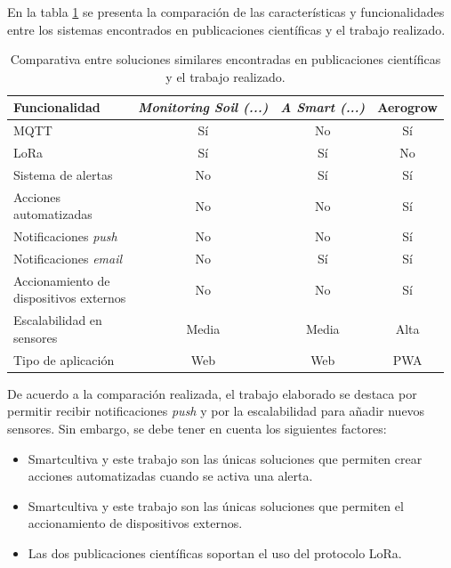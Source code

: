 En la tabla \ref{tab:comparativaTrabajoSolucionesPublicacionesCientificas} se presenta la comparación de las características y funcionalidades entre los sistemas encontrados en publicaciones científicas y el trabajo realizado.

\begin{table}[H]
	\centering
	\caption[Comparativa entre soluciones similares encontradas en publicaciones científicas y el trabajo realizado]{Comparativa entre soluciones similares encontradas en publicaciones científicas y el trabajo realizado.}
	\begin{tabular}{l c c c}    
		\toprule 
		\textbf{Funcionalidad} & \textbf{\textit{Monitoring Soil (...)}} & \textbf{\textit{A Smart (...)}}  & \textbf{Aerogrow}\\
		\midrule
		MQTT & Sí & No  & Sí\\
		LoRa & Sí & Sí  & No\\
		Sistema de alertas & No & Sí & Sí\\
		\shortstack{Acciones \\ automatizadas} & No & No & Sí\\
		Notificaciones \emph{push} & No & No & Sí\\
		Notificaciones \textit{email} & No & Sí & Sí\\
		\shortstack{Accionamiento de \\ dispositivos externos} & No & No & Sí\\
		\shortstack{Escalabilidad en \\ sensores} & Media & Media & Alta\\
		Tipo de aplicación & Web & Web & PWA\\
		\bottomrule
		\hline
	\end{tabular}
	\label{tab:comparativaTrabajoSolucionesPublicacionesCientificas}
\end{table}

De acuerdo a la comparación realizada, el trabajo elaborado se destaca por permitir recibir notificaciones \emph{push} y por la escalabilidad para añadir nuevos sensores. Sin embargo, se debe tener en cuenta los siguientes factores:

\begin{itemize}
\item Smartcultiva y este trabajo son las únicas soluciones que permiten crear acciones automatizadas cuando se activa una alerta. 
\item Smartcultiva y este trabajo son las únicas soluciones que permiten el accionamiento de dispositivos externos.
\item Las dos publicaciones científicas soportan el uso del protocolo LoRa.
\end{itemize}